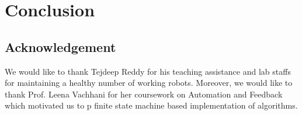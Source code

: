 \documentclass{report}[12pt]
\begin{document}
\chapter{Conclusion}
\section{Acknowledgement}
We would like to thank Tejdeep Reddy for his teaching assistance and lab staffs for maintaining a healthy number of working robots. Moreover, we would like to thank Prof. Leena Vachhani for her coursework on Automation and Feedback which motivated us to p finite state machine based implementation of algorithms.
{}

\end{document}
